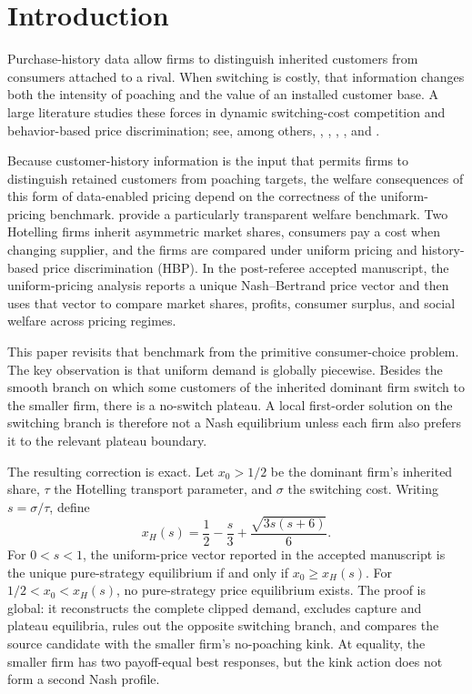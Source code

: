 \section{Introduction}
\label{sec:introduction}

Purchase-history data allow firms to distinguish inherited customers from consumers attached to a rival. When switching is costly, that information changes both the intensity of poaching and the value of an installed customer base. A large literature studies these forces in dynamic switching-cost competition and behavior-based price discrimination; see, among others, \citet{Klemperer1995}, \citet{Chen1997}, \citet{VillasBoas1999}, \citet{FudenbergTirole2000}, and \citet{ShafferZhang2000}.

Because customer-history information is the input that permits firms to distinguish retained customers from poaching targets, the welfare consequences of this form of data-enabled pricing depend on the correctness of the uniform-pricing benchmark. \citet{GehrigShyStenbacka2012} provide a particularly transparent welfare benchmark. Two Hotelling firms inherit asymmetric market shares, consumers pay a cost when changing supplier, and the firms are compared under uniform pricing and history-based price discrimination (HBP). In the post-referee accepted manuscript, the uniform-pricing analysis reports a unique Nash--Bertrand price vector and then uses that vector to compare market shares, profits, consumer surplus, and social welfare across pricing regimes.

This paper revisits that benchmark from the primitive consumer-choice problem. The key observation is that uniform demand is globally piecewise. Besides the smooth branch on which some customers of the inherited dominant firm switch to the smaller firm, there is a no-switch plateau. A local first-order solution on the switching branch is therefore not a Nash equilibrium unless each firm also prefers it to the relevant plateau boundary.

The resulting correction is exact. Let \(x_0>1/2\) be the dominant firm's inherited share, \(\tau\) the Hotelling transport parameter, and \(\sigma\) the switching cost. Writing \(s=\sigma/\tau\), define
\[
x_H(s)
=
\frac12-\frac{s}{3}
+\frac{\sqrt{3s(s+6)}}6.
\]
For \(0<s<1\), the uniform-price vector reported in the accepted manuscript is the unique pure-strategy equilibrium if and only if \(x_0\ge x_H(s)\). For \(1/2<x_0<x_H(s)\), no pure-strategy price equilibrium exists. The proof is global: it reconstructs the complete clipped demand, excludes capture and plateau equilibria, rules out the opposite switching branch, and compares the source candidate with the smaller firm's no-poaching kink. At equality, the smaller firm has two payoff-equal best responses, but the kink action does not form a second Nash profile.

